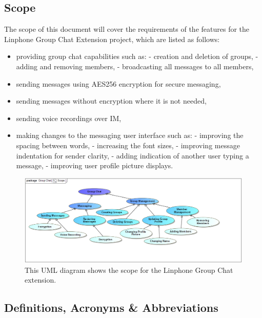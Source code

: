 \documentclass[11pt]{article}
\begin{document}
\subsection{Scope}
The scope of this document will cover the requirements of the features for the Linphone Group Chat Extension project, which are listed as follows:
\begin{itemize}
\item providing group chat capabilities such as:
\subitem  - creation and deletion of groups,
\subitem  - adding and removing members,
\subitem  - broadcasting all messages to all members,
\item sending messages using AES256 encryption for secure messaging,
\item sending messages without encryption where it is not needed,
\item sending voice recordings over IM,
\item making changes to the messaging user interface such as:
\subitem  - improving the spacing between words,
\subitem  - increasing the font sizes,
\subitem  - improving message indentation for sender clarity,
\subitem  - adding indication of another user typing a message,
\subitem  - improving user profile picture displays.
\end{itemize}
\begin{figure}[H]
\centering
\includegraphics[width=5in]{./images/scope_master.png}
\caption[Group Chat Extension Scope]{This UML diagram shows the scope for the Linphone Group Chat extension.}
\label{figure-scope-master}
\end{figure}
\subsection{Definitions, Acronyms \& Abbreviations}
\end{document}
